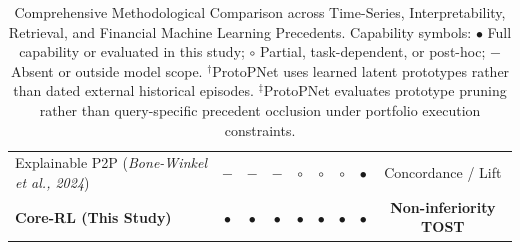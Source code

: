\begin{table}[p]
\begin{tabular}{lcccccccc}
Explainable P2P (\textit{Bone-Winkel et al., 2024}) & $-$ & $-$ & $-$ & $\circ$ & $\circ$ & $\circ$ & $\bullet$ & Concordance / Lift \\
\textbf{Core-RL (This Study)} & $\bullet$ & $\bullet$ & $\bullet$ & $\bullet$ & $\bullet$ & $\bullet$ & $\bullet$ & \textbf{Non-inferiority TOST} \\
\bottomrule
\end{tabular}
\caption{Comprehensive Methodological Comparison across Time-Series, Interpretability, Retrieval, and Financial Machine Learning Precedents. Capability symbols: $\bullet$ Full capability or evaluated in this study; $\circ$ Partial, task-dependent, or post-hoc; $-$ Absent or outside model scope. $^{\dagger}$ProtoPNet uses learned latent prototypes rather than dated external historical episodes. $^{\ddagger}$ProtoPNet evaluates prototype pruning rather than query-specific precedent occlusion under portfolio execution constraints.}
\label{tab:novelty_full_comparison}
\end{table}
